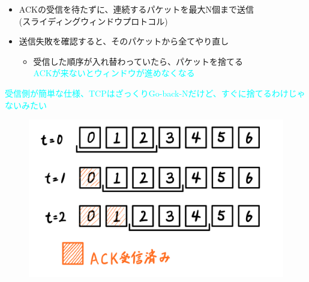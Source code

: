 \begin{itemize}
  \item ACKの受信を待たずに、連続するパケットを最大N個まで送信\\
    (スライディングウィンドウプロトコル)
  \item 送信失敗を確認すると、そのパケットから全てやり直し
  \begin{itemize}
    \item 受信した順序が入れ替わっていたら、パケットを捨てる\\
      \textcolor{cyan}{ACKが来ないとウィンドウが進めなくなる}
  \end{itemize}
\end{itemize}
\textcolor{cyan}{受信側が簡単な仕様、TCPはざっくりGo-back-Nだけど、すぐに捨てるわけじゃないみたい}

\begin{figure}[h]
  \centering
  \includegraphics[width=0.4\linewidth]{image/go_back_n.png}
\end{figure}
